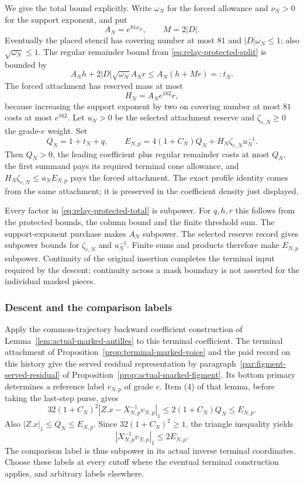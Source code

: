 We give the total bound explicitly. Write $\omega_N$ for the forced
allowance and $\nu_N>0$ for the support exponent, and put
\[
 A_N=e^{81\nu_N},\qquad M=2|D|.
\]
Eventually the placed stencil has covering number at most $81$ and
$|D|\omega_N\le1$; also $\sqrt{\omega_N}\le1$. The regular remainder
bound from \eqref{eq:relay-protected-split} is bounded by
\[
       A_Nh+2|D|\sqrt{\omega_N}A_Nr
                              \le A_N(h+Mr)=:t_N.
\]
The forced attachment has reserved mass at most
\[
                         H_N=A_Ne^{162}r,
\]
because increasing the support exponent by two on covering number at
most $81$ costs at most $e^{162}$. Let $u_N>0$ be the selected attachment
reserve and $\zeta_{e,N}\ge0$ the grade-$e$ weight. Set
\begin{equation}\label{eq:relay-protected-total}
 Q_N=1+t_N+q,\qquad
 E_{N,p}=4(1+C_N)Q_N+H_N\zeta_{e,N}u_N^{-1}.
\end{equation}
Then $Q_N>0$, the leading coefficient plus regular remainder costs at
most $Q_N$, the first summand pays its required terminal cone allowance,
and $H_N\zeta_{e,N}\le u_NE_{N,p}$ pays the forced attachment. The exact
profile identity comes from the same attachment; it is preserved in
the coefficient density just displayed.

Every factor in \eqref{eq:relay-protected-total} is subpower. For $q,h,r$
this follows from the protected bounds, the column bound and the finite
threshold sum. The support-exponent purchase makes $A_N$ subpower.
The selected reserve record gives subpower bounds for $\zeta_{e,N}$
and $u_N^{-1}$. Finite sums and products therefore make $E_{N,p}$
subpower. Continuity of the original insertion completes the terminal
input required by the descent; continuity across a mask boundary is
not asserted for the individual masked pieces.

\subsubsection{Descent and the comparison labels}

Apply the common-trajectory backward coefficient construction of
Lemma~\ref{lem:actual-marked-antilles} to this terminal coefficient.
The terminal attachment of Proposition~\ref{prop:terminal-marked-voice}
and the paid record on this history give the served residual representation
by paragraph~\ref{par:figment-served-residual} of
Proposition~\ref{prop:actual-marked-figment}.
Its bottom primary determines a reference label $v_{N,p}$ of grade
$e$. Item (4) of that lemma, before taking the last-step purse,
gives
\[
 32(1+C_N)^2|Z.x-X_{N,p}^{-1}v_{N,p}|_1
                    \le2(1+C_N)Q_N\le E_{N,p}.
\]
Also $|Z.x|_1\le Q_N\le E_{N,p}$. Since $32(1+C_N)^2\ge1$, the
triangle inequality yields
\[
                         |X_{N,p}^{-1}v_{N,p}|_1\le2E_{N,p}.
\]
The comparison label is thus subpower in its actual inverse terminal
coordinates. Choose these labels at every cutoff where the eventual
terminal construction applies, and arbitrary labels elsewhere.


